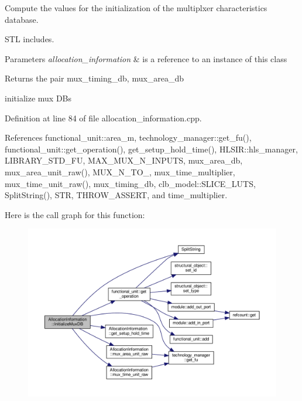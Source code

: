 Compute the values for the initialization of the multiplxer characteristics database. 

S\+TL includes.


\begin{DoxyParams}{Parameters}
{\em allocation\+\_\+information} & is a reference to an instance of this class \\
\hline
\end{DoxyParams}
\begin{DoxyReturn}{Returns}
the pair mux\+\_\+timing\+\_\+db, mux\+\_\+area\+\_\+db 
\end{DoxyReturn}
initialize mux D\+Bs 

Definition at line 84 of file allocation\+\_\+information.\+cpp.



References functional\+\_\+unit\+::area\+\_\+m, technology\+\_\+manager\+::get\+\_\+fu(), functional\+\_\+unit\+::get\+\_\+operation(), get\+\_\+setup\+\_\+hold\+\_\+time(), H\+L\+S\+I\+R\+::hls\+\_\+manager, L\+I\+B\+R\+A\+R\+Y\+\_\+\+S\+T\+D\+\_\+\+FU, M\+A\+X\+\_\+\+M\+U\+X\+\_\+\+N\+\_\+\+I\+N\+P\+U\+TS, mux\+\_\+area\+\_\+db, mux\+\_\+area\+\_\+unit\+\_\+raw(), M\+U\+X\+\_\+\+N\+\_\+\+T\+O\+\_, mux\+\_\+time\+\_\+multiplier, mux\+\_\+time\+\_\+unit\+\_\+raw(), mux\+\_\+timing\+\_\+db, clb\+\_\+model\+::\+S\+L\+I\+C\+E\+\_\+\+L\+U\+TS, Split\+String(), S\+TR, T\+H\+R\+O\+W\+\_\+\+A\+S\+S\+E\+RT, and time\+\_\+multiplier.

Here is the call graph for this function\+:
\nopagebreak
\begin{figure}[H]
\begin{center}
\leavevmode
\includegraphics[width=350pt]{d7/d79/classAllocationInformation_ad396c6ab4099e242cdf8411c932fd859_cgraph}
\end{center}
\end{figure}
\mbox{\label{classAllocationInformation_af4a69fd5612c7c12cd0fa2b55d18d9c5}} 
